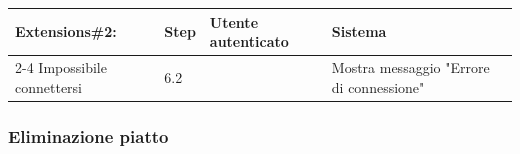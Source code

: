 \begin{table}[H]
\begin{tabularx}{\linewidth}{|l|X|X|X|}
    \hline \multirow{2}{*}{Extensions\#2: }  & Step                                                                                                                    & Utente autenticato             & Sistema                                          \\
    \cline{2-4} Impossibile connettersi      & 6.2                                                                                                                     &                                & Mostra messaggio "Errore di connessione"         \\
    \hline
  \end{tabularx}
\end{table}
\subsubsection{Eliminazione piatto}
